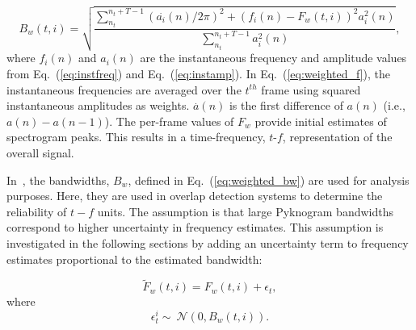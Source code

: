 {\begin{equation}
\label{eq:weighted_bw}
B_w(t,i) = \sqrt{\frac{\sum_{n_t}^{n_t+T-1}(\overset{\boldsymbol .}{a_i}(n) /2\pi)^2+(f_i(n)-F_w(t,i))^2a_i^2(n)}{\sum_{n_t}^{n_t+T-1}a_i^2(n)}},
\end{equation}
where $f_i(n)$ and $a_i(n)$ are the instantaneous frequency and amplitude values from Eq.~(\ref{eq:instfreq}) and Eq.~(\ref{eq:instamp}). 
In Eq.~(\ref{eq:weighted_f}), the instantaneous frequencies are averaged over the $t^{th}$ frame using squared instantaneous amplitudes as weights. 
$\overset{\boldsymbol .}{a}(n)$ is the first difference of $a(n)$ (i.e., $a(n) - a(n-1)$). 
The per-frame values of $F_w$ provide initial estimates of spectrogram peaks. 
This results in a time-frequency, {$t$-$f$}, representation of the overall signal. 


In~\cite{potamianos_maragos_jasa96}, the bandwidths, $B_w$, defined in Eq.~(\ref{eq:weighted_bw}) are used for analysis purposes. 
Here, they are used in overlap detection systems to determine the reliability of $t-f$ units. 
The assumption is that large Pyknogram bandwidths correspond to higher uncertainty in frequency estimates. 
This assumption is investigated in the following sections by adding an uncertainty term to frequency estimates proportional to the estimated bandwidth:

\begin{equation}
\label{eq:jitter_f}
\tilde F_w(t,i) = F_w(t,i) + \epsilon_t,
\end{equation}
where
\begin{equation}
\label{eq:jitter_pdf}
\epsilon^i_t \sim\ \mathcal{N}(0,B_w(t,i)).
\end{equation}

}
